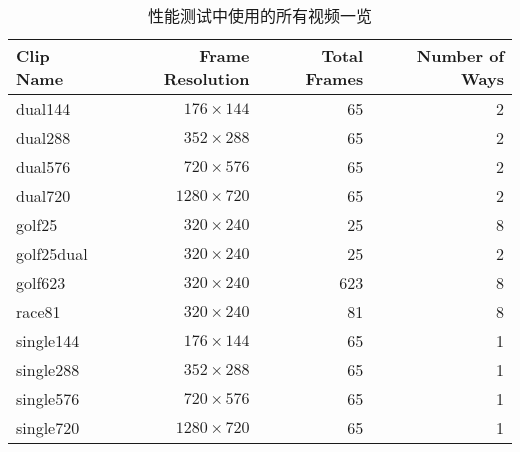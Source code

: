 \begin{table}[htbp]
  \centering
  \begin{minipage}[t]{\linewidth}
  \caption{性能测试中使用的所有视频一览}
  \label{tab:testclips}
  \centering
    \begin{tabular}{lrrr}
    \addlinespace
    \toprule[1.5pt]
    \textbf{Clip Name} & \textbf{Frame Resolution} & \textbf{Total Frames} & \textbf{Number of Ways} \\
    \midrule[1pt]
    dual144		& $176\times 144$	& 65	& 2 \\
    dual288		& $352\times 288$	& 65	& 2 \\
    dual576		& $720\times 576$	& 65	& 2 \\
    dual720		& $1280\times 720$	& 65	& 2 \\
    golf25		& $320\times 240$	& 25	& 8 \\
    golf25dual	& $320\times 240$	& 25	& 2 \\
    golf623		& $320\times 240$	& 623	& 8 \\
    race81		& $320\times 240$	& 81	& 8 \\
    single144	& $176\times 144$	& 65	& 1 \\
    single288	& $352\times 288$	& 65	& 1 \\
    single576	& $720\times 576$	& 65	& 1 \\
    single720	& $1280\times 720$	& 65	& 1 \\
    \bottomrule[1.5pt]
    \end{tabular}
  \end{minipage}
\end{table}